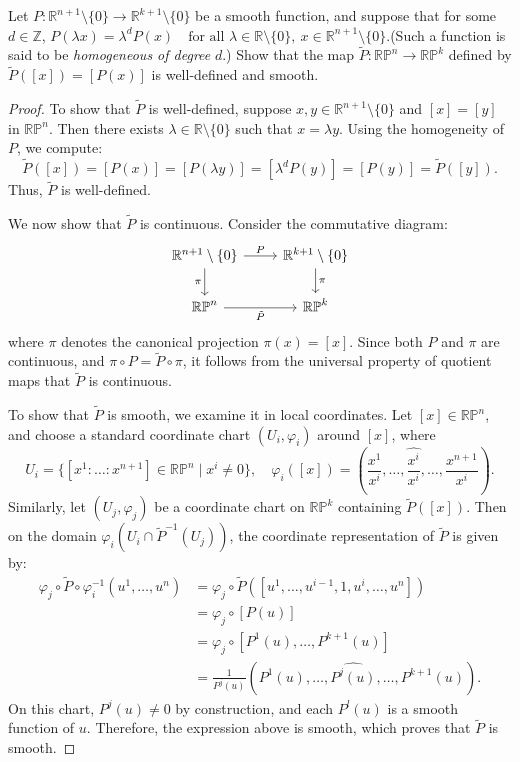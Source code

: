 \begin{problem}
    Let $P \colon \mathbb{R}^{n+1} \setminus \{0\} \to \mathbb{R}^{k+1} \setminus \{0\}$ be a smooth function, and suppose that for some $d \in \mathbb{Z}$, $P(\lambda x) = \lambda^d P(x) \quad \text{for all } \lambda \in \mathbb{R} \setminus \{0\},\ x \in \mathbb{R}^{n+1} \setminus \{0\}$.(Such a function is said to be \emph{homogeneous of degree} $d$.) Show that the map $\tilde{P} \colon \mathbb{RP}^n \to \mathbb{RP}^k$ defined by $\tilde{P}([x]) = [P(x)]$ is well-defined and smooth.

    \begin{proof}
    To show that $\tilde{P}$ is well-defined, suppose $x, y \in \mathbb{R}^{n+1} \setminus \{0\}$ and $[x] = [y]$ in $\mathbb{RP}^n$. Then there exists $\lambda \in \mathbb{R} \setminus \{0\}$ such that $x = \lambda y$. Using the homogeneity of $P$, we compute:
    \[
    \tilde{P}([x]) = [P(x)] = [P(\lambda y)] = [\lambda^d P(y)] = [P(y)] = \tilde{P}([y]).
    \]
    Thus, $\tilde{P}$ is well-defined.

    We now show that $\tilde{P}$ is continuous. Consider the commutative diagram:
    \[
    \begin{tikzcd}
    \mathbb{R}^{n+1} \setminus \{0\} \arrow[r, "P"] \arrow[d, "\pi"'] & \mathbb{R}^{k+1} \setminus \{0\} \arrow[d, "\pi"] \\
    \mathbb{RP}^n \arrow[r, "\tilde{P}"'] & \mathbb{RP}^k
    \end{tikzcd}
    \]
    where $\pi$ denotes the canonical projection $\pi(x) = [x]$. Since both $P$ and $\pi$ are continuous, and $\pi \circ P = \tilde{P} \circ \pi$, it follows from the universal property of quotient maps that $\tilde{P}$ is continuous.

    To show that $\tilde{P}$ is smooth, we examine it in local coordinates. Let $[x] \in \mathbb{RP}^n$, and choose a standard coordinate chart $(U_i, \varphi_i)$ around $[x]$, where
    \[
    U_i = \{ [x^1:\dots:x^{n+1}] \in \mathbb{RP}^n \mid x^i \ne 0 \}, \quad \varphi_i([x]) = \left( \frac{x^1}{x^i}, \dots, \widehat{\frac{x^i}{x^i}}, \dots, \frac{x^{n+1}}{x^i} \right).
    \]
    Similarly, let $(U_j, \varphi_j)$ be a coordinate chart on $\mathbb{RP}^k$ containing $\tilde{P}([x])$. Then on the domain $\varphi_i(U_i \cap \tilde{P}^{-1}(U_j))$, the coordinate representation of $\tilde{P}$ is given by:
    \begin{align*}
    \varphi_j \circ \tilde{P} \circ \varphi_i^{-1}(u^1, \dots, u^n) 
    &= \varphi_j \circ \tilde{P}([u^1, \dots, u^{i-1}, 1, u^i, \dots, u^n]) \\
    &= \varphi_j \circ [P(u)] \\
    &= \varphi_j \circ [P^1(u), \dots, P^{k+1}(u)] \\
    &= \frac{1}{P^j(u)} \left( P^1(u), \dots, \widehat{P^j(u)}, \dots, P^{k+1}(u) \right).
    \end{align*}
    On this chart, $P^j(u) \ne 0$ by construction, and each $P^l(u)$ is a smooth function of $u$. Therefore, the expression above is smooth, which proves that $\tilde{P}$ is smooth.
    \end{proof}
\end{problem}

